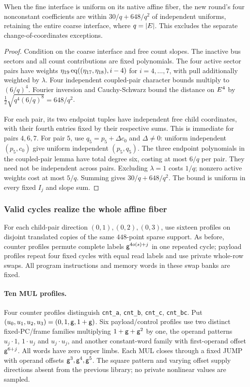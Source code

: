 \begin{lemma}
When the fine interface is uniform on its native affine fiber, the new round's four nonconstant coefficients are within $30/q+648/q^2$ of independent uniforms, retaining the entire coarse interface, where $q=|E|$. This excludes the separate change-of-coordinates exceptions.
\end{lemma}
\begin{proof}
Condition on the coarse interface and free count slopes. The inactive bus sectors and all count contributions are fixed polynomials. The four active sector pairs have weights $\eta_{19}\operatorname{eq}((\eta_{17},\eta_{18}),i-4)$ for $i=4,\ldots,7$, with pull additionally weighted by $\lambda$. Four independent coupled-pair character bounds multiply to $(6/q)^4$. Fourier inversion and Cauchy-Schwarz bound the distance on $E^4$ by $\tfrac12\sqrt{q^4(6/q)^8}=648/q^2$.

For each pair, its two endpoint tuples have independent free child coordinates, with their fourth entries fixed by their respective sums. This is immediate for pairs $4,6,7$. For pair $5$, use $q_5=p_5+\Delta c_0$ and $\Delta\ne0$: uniform independent $(p_5,c_0)$ give uniform independent $(p_5,q_5)$. The three endpoint polynomials in the coupled-pair lemma have total degree six, costing at most $6/q$ per pair. They need not be independent across pairs. Excluding $\lambda=1$ costs $1/q$; nonzero active weights cost at most $5/q$. Summing gives $30/q+648/q^2$. The bound is uniform in every fixed $I_j$ and slope sum.
\end{proof}

\subsubsection{Valid cycles realize the whole affine fiber}

For each child-pair direction $(0,1),(0,2),(0,3)$, use sixteen profiles on disjoint translated copies of the same $448$-point sparse support. As before, counter profiles permute complete labels $\mathsf{g}^{4o(s)+j}$ in one repeated cycle; payload profiles repeat four fixed cycles with equal read labels and use private whole-row swaps. All program instructions and memory words in these swap banks are fixed.

\paragraph{Ten MUL profiles.} Four counter profiles distinguish \texttt{cnt\_a}, \texttt{cnt\_b}, \texttt{cnt\_c}, \texttt{cnt\_bc}. Put $(u_0,u_1,u_2,u_3)=(0,1,\mathsf{g},1+\mathsf{g})$. Six payload/control profiles use two distinct fixed-PC/frame families multiplying $1+\mathsf{g}+\mathsf{g}^2$ by one, the operand patterns $u_j\cdot1$, $1\cdot u_j$ and $u_j\cdot u_j$, and another constant-word family with first-operand offset $\mathsf{g}^{6+j}$. All words have zero upper limbs. Each MUL closes through a fixed JUMP with operand offsets $\mathsf{g}^3,\mathsf{g}^4,\mathsf{g}^5$. The square pattern and varying offset supply directions absent from the previous library; no private nonlinear values are sampled.

